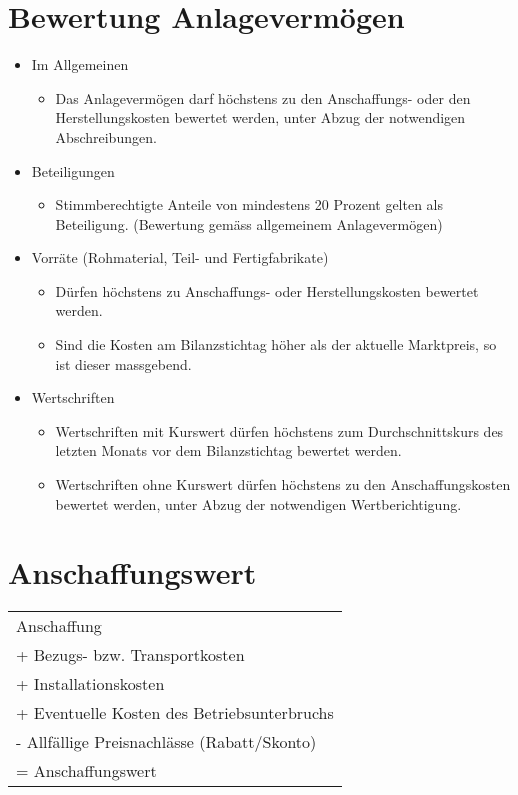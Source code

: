 \section*{Bewertung Anlagevermögen}
\begin{itemize}
\item Im Allgemeinen

\begin{itemize}
\item Das Anlagevermögen darf höchstens zu den Anschaffungs- oder den Herstellungskosten
bewertet werden, unter Abzug der notwendigen Abschreibungen.
\end{itemize}
\item Beteiligungen

\begin{itemize}
\item Stimmberechtigte Anteile von mindestens 20 Prozent gelten als Beteiligung.
(Bewertung gemäss allgemeinem Anlagevermögen)
\end{itemize}
\item Vorräte (Rohmaterial, Teil- und Fertigfabrikate)

\begin{itemize}
\item Dürfen höchstens zu Anschaffungs- oder Herstellungskosten bewertet
werden.
\item Sind die Kosten am Bilanzstichtag höher als der aktuelle Marktpreis,
so ist dieser massgebend.
\end{itemize}
\item Wertschriften

\begin{itemize}
\item Wertschriften mit Kurswert dürfen höchstens zum Durchschnittskurs
des letzten Monats vor dem Bilanzstichtag bewertet werden.
\item Wertschriften ohne Kurswert dürfen höchstens zu den Anschaffungskosten
bewertet werden, unter Abzug der notwendigen Wertberichtigung.
\end{itemize}
\end{itemize}

\section*{Anschaffungswert}

\begin{tabular}{l}
Anschaffung\tabularnewline
+ Bezugs- bzw. Transportkosten\tabularnewline
+ Installationskosten\tabularnewline
+ Eventuelle Kosten des Betriebsunterbruchs\tabularnewline
- Allfällige Preisnachlässe (Rabatt/Skonto)\tabularnewline
\hline 
= Anschaffungswert\tabularnewline
\end{tabular}


